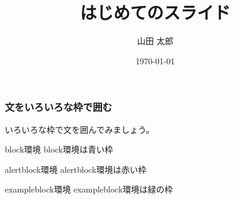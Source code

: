\documentclass{beamer}
\title{はじめてのスライド}
\author{山田 太郎}
\institute{羅手府大学}
\date{\today}
\begin{document}
\maketitle
\begin{frame}
  \frametitle{文をいろいろな枠で囲む}
  いろいろな枠で文を囲んでみましょう。
  \begin{block}{block環境}
    block環境は青い枠
  \end{block}
  \begin{alertblock}{alertblock環境}
    alertblock環境は赤い枠
  \end{alertblock}
  \begin{exampleblock}{exampleblock環境}
    exampleblock環境は緑の枠
  \end{exampleblock}
\end{frame}
\end{document}
